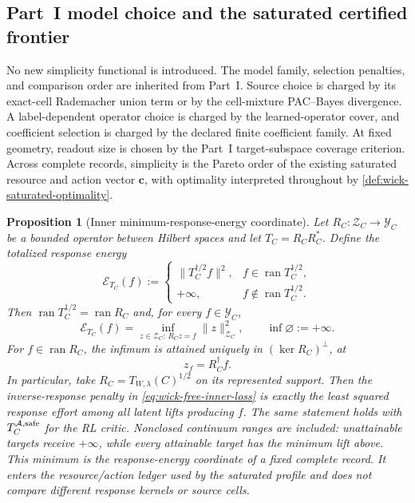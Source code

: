 \documentclass[11pt]{article}
\numberwithin{section}{part}
\theoremstyle{plain}
\newtheorem{proposition}[proposition]{Proposition}
\theoremstyle{definition}
\theoremstyle{remark}
\begin{document}
\subsection{Part~I model choice and the saturated certified frontier}
\label{subsec:wick-observable-minimality}

No new simplicity functional is introduced.  The model family, selection
penalties, and comparison order are inherited from Part~I.  Source choice is
charged by its exact-cell Rademacher union term or by the cell-mixture
PAC--Bayes divergence.  A label-dependent operator choice is charged by the
learned-operator cover, and coefficient selection is charged by the declared
finite coefficient family.  At fixed geometry, readout size is chosen by the
Part~I target-subspace coverage criterion.  Across complete records,
simplicity is the Pareto order of the existing saturated resource and action
vector \(\mathbf c\), with optimality interpreted throughout by
\cref{def:wick-saturated-optimality}.

\begin{proposition}[Inner minimum-response-energy coordinate]
\label{prop:wick-quotient-energy-minimality}
Let \(R_C:\mathcal Z_C\to\mathcal Y_C\) be a bounded operator between
Hilbert spaces and let \(T_C=R_CR_C^*\).  Define the totalized response
energy
\begin{equation}
 \label{eq:wick-totalized-response-energy}
 \mathcal E_{T_C}(f):=
 \begin{cases}
  \|T_C^{\dagger/2}f\|^2,&f\in\operatorname{ran}T_C^{1/2},\\
  +\infty,&f\notin\operatorname{ran}T_C^{1/2}.
 \end{cases}
\end{equation}
Then \(\operatorname{ran}T_C^{1/2}=\operatorname{ran}R_C\) and, for every
\(f\in\mathcal Y_C\),
\begin{equation}
 \label{eq:wick-minimum-lift-energy}
 \mathcal E_{T_C}(f)
 =\inf_{z\in\mathcal Z_C:\,R_Cz=f}\|z\|_{\mathcal Z_C}^2,
 \qquad \inf\varnothing:=+\infty.
\end{equation}
For \(f\in\operatorname{ran}R_C\), the infimum is attained uniquely in
\((\ker R_C)^\perp\), at
\begin{equation}
 \label{eq:wick-minimum-lift}
 z_f=R_C^\dagger f.
\end{equation}
In particular, take \(R_C=T_{W,\lambda}(C)^{1/2}\) on its represented
support.  Then the inverse-response penalty in
\eqref{eq:wick-free-inner-loss} is exactly the least squared response effort
among all latent lifts producing \(f\).  The same statement holds with
\(T_C^{\mathcal A,{\rm safe}}\) for the RL critic.  Nonclosed continuum
ranges are included: unattainable targets receive \(+\infty\), while every
attainable target has the minimum lift above.
This minimum is the response-energy coordinate of a fixed complete record.
It enters the resource/action ledger used by the saturated profile and does
not compare different response kernels or source cells.
\end{proposition}
\end{document}
